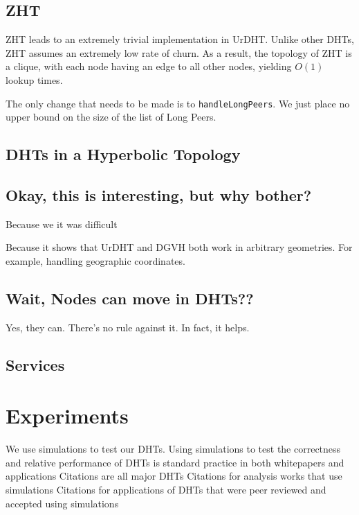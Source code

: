 \documentclass[11pt,conference]{IEEEtran}
\begin{document}
\subsection{ZHT}
ZHT \cite{li2013zht} leads to an extremely trivial implementation in UrDHT.
Unlike other DHTs, ZHT assumes an extremely low rate of churn.
As a result, the topology of ZHT is a clique, with each node having an edge to all other nodes, yielding $ O(1) $ lookup times.

The only change that needs to be made is to \texttt{handleLongPeers}.
We just place no upper bound on the size of the list of Long Peers.
\subsection{DHTs in a Hyperbolic Topology}
	
\label{sec:hyper}
	

	
	
	
	\subsection{Okay, this is interesting, but why bother?}
	Because we it was difficult
	
	Because it shows that UrDHT and DGVH both work in arbitrary geometries.
	For example, handling geographic coordinates. 
	
	
	\subsection{Wait, Nodes can move in DHTs??}
	Yes, they can.  
	There's no rule against it. 
	In fact, it helps.
	
	\subsection{Services}
	
	
\section{Experiments}
\label{sec:experiments}

We use simulations to test our DHTs.
Using simulations to test the correctness and relative performance of DHTs is standard practice in both whitepapers and applications
Citations are all major DHTs
Citations for analysis works that use simulations
Citations for applications of DHTs that were peer reviewed and accepted using simulations
\end{document}
